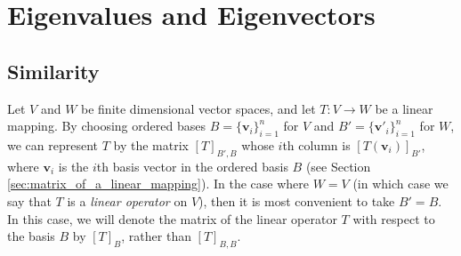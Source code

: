 \documentclass[12pt,letterpaper,reqno]{article}
\numberwithin{equation}{section}
\newcommand{\bv}{\mathbf{v}}
\begin{document}
\section{Eigenvalues and Eigenvectors}\label{sec:eigen}
\subsection{Similarity}
Let $V$ and $W$ be finite dimensional vector spaces, and let $T:V \to W$ be a linear mapping. By choosing ordered bases $B=\{\bv_i\}_{i=1}^n$ for $V$ and $B'=\{\bv'_i\}_{i=1}^n$ for $W$, we can represent $T$ by the matrix $[T]_{B',B}$ whose $i$th column is $[T(\bv_i)]_{B'}$, where $\bv_i$ is the $i$th basis vector in the ordered basis $B$ (see Section \ref{sec:matrix_of_a_linear_mapping}). In the case where $W=V$ (in which case we say that $T$ is a \emph{linear operator} on $V$), then it is most convenient to take $B'=B$. In this case, we will denote the matrix of the linear operator $T$ with respect to the basis $B$ by $[T]_B$, rather than $[T]_{B,B}$.
 
\end{document}
